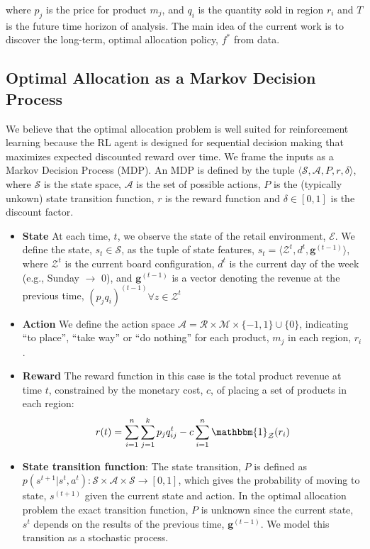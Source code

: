 where $p_j$ is the price for product $m_j$, and $q_i$ is the quantity sold in region $r_i$ and $T$ is the future time horizon of analysis. The main idea of the current work is to discover the long-term, optimal allocation policy, $f^{\ast}$ from data.

\subsection{Optimal Allocation as a Markov Decision Process}
We believe that the optimal allocation problem is well suited for reinforcement learning because the RL agent is designed for sequential decision making that maximizes expected discounted reward over time. We frame the inputs as a Markov Decision Process (MDP). An MDP is defined by the tuple $\langle \mathcal{S}, \mathcal{A}, P, r, \delta  \rangle$, where $\mathcal{S}$ is the state space, $\mathcal{A}$ is the set of possible actions, $P$ is the (typically unkown) state transition function, $r$ is the reward function and $\delta \in [0,1]$ is the discount factor. 

\begin{itemize}
    \item \textbf{State} At each time, $t$, we observe the state of the retail environment, $\mathcal{E}$. We define the state, $s_t \in \mathcal{S}$, as the tuple of state features, $s_t = \langle \mathcal{Z}^{{t}}, d^{t}, \textbf{g}^{(t-1)}  \rangle$, where $\mathcal{Z}^{{t}}$ is the current board configuration, $d^t$ is the current day of the week (e.g., Sunday $\rightarrow$ 0), and $\textbf{g}^{(t-1)}$ is a vector denoting the revenue at the previous time, $(p_j q_i)^{(t-1)} \forall z \in \mathcal{Z}^t$

    \item \textbf{Action} We define the action space  $\mathcal{A} = \mathcal{R} \times \mathcal{M} \times \{-1, 1\} \cup \{0\}$, indicating ``to place'', ``take way'' or ``do nothing'' for each product, $m_j$ in each region, $r_i$.
    \item \textbf{Reward} The reward function in this case is the total product revenue at time $t$, constrained by the monetary cost, $c$, of placing a set of products in each region:
    \begin{equation}
        r(t) = \sum_{i=1}^n \sum_{j=1}^k p_j q_{ij}^{t} - c \sum_{i=1}^n \mathbbm{1}_{\mathcal{Z}}(r_i)
    \end{equation}
    
    \item \textbf{State transition function}: The state transition, $P$ is defined as $p(s^{t+1} | s^t, a^t): \mathcal{S} \times \mathcal{A} \times \mathcal{S} \rightarrow [0,1]$, which gives the probability of moving to state, $s^{(t+1)}$ given the current state and action. In the optimal allocation problem the exact transition function, $P$ is unknown since the current state, $s^t$ depends on the results of the previous time, $\textbf{g}^{(t-1)}$. We model this transition as a stochastic process.
\end{itemize}